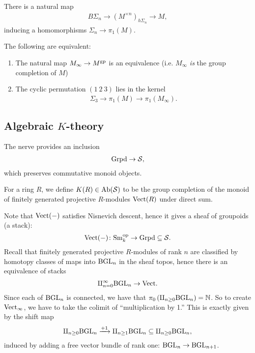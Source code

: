 \documentclass[11pt,openany]{book}
\begin{document}
There is a natural map
\begin{align*}
    B\Sigma_n \to (M^{\times n})_{h\Sigma_n} \to M,
\end{align*}
inducing a homomorphisms $\Sigma_n \to \pi_1(M)$.

\begin{theorem} \cite[Prop.~6]{Nikolaus-gp}
The following are equivalent:
\begin{enumerate}
    \item The natural map $M_\infty \to M^{\mathrm{gp}}$ is an equivalence (i.e. $M_\infty$ \textit{is} the group completion of $M$)
    \item The cyclic permutation $(1\ 2\ 3)$ lies in the kernel
    \begin{align*}
        \Sigma_3 \to \pi_1(M) \to \pi_1(M_\infty).
    \end{align*} 
\end{enumerate}
\end{theorem}

\subsection{Algebraic $K$-theory}

The nerve provides an inclusion
\begin{align*}
    \mathrm{Grpd} \to \mathcal{S},
\end{align*}
which preserves commutative monoid objects.

\begin{definition} For a ring $R$, we define $K(R) \in \mathrm{Ab}(\mathcal{S})$ to be the group completion of the monoid of finitely generated projective $R$-modules $\mathrm{Vect}(R)$ under direct sum.
\end{definition}

Note that $\mathrm{Vect}(-)$ satisfies Nisnevich descent, hence it gives a sheaf of groupoids (a stack):
\begin{align*}
    \mathrm{Vect}(-) \colon \mathrm{Sm}_k^{\mathrm{op}} \to \mathrm{Grpd} \subseteq \mathcal{S}.
\end{align*}
%
Recall that finitely generated projective $R$-modules of rank $n$ are classified by homotopy classes of maps into $\mathrm{BGL}_n$ in the sheaf topos, hence there is an equivalence of stacks
\begin{align*}
    \amalg_{n=0}^\infty \mathrm{BGL}_n \to \mathrm{Vect}.
\end{align*}
%
Since each of $\mathrm{BGL}_n$ is connected, we have that $\pi_0 \left( \amalg_{n\ge0} \mathrm{BGL}_n \right) = \mathbb{N}$. So to create $\mathrm{Vect}_\infty$, we have to take the colimit of ``multiplication by 1.'' This is exactly given by the shift map
\begin{align*}
    \amalg_{n\ge0} \mathrm{BGL}_n\xrightarrow{\text{+1}} \amalg_{n\ge 1} \mathrm{BGL}_n \subseteq \amalg_{n\ge 0}\mathrm{BGL}_n,
\end{align*}
induced by adding a free vector bundle of rank one: $\mathrm{BGL}_n \to \mathrm{BGL}_{n+1}$.
\end{document}
